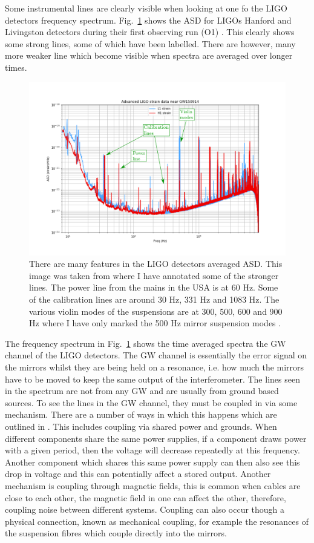 Some instrumental lines are clearly visible when looking at one fo the \ac{LIGO} detectors frequency spectrum. Fig.~\ref{detchar:line:psd} shows the \ac{ASD} for \acp{LIGO} Hanford and Livingston detectors during their first observing run (O1) \citep{GWOpen}. This clearly shows some strong lines, some of which have been labelled. There are however, many more weaker line which become visible when spectra are averaged over longer times.
\begin{figure}
    \centering
    \includegraphics[width=\textwidth]{C5_detchar/ligo_o1_asd_annot.pdf}
    \caption{There are many features in the \ac{LIGO} detectors averaged \ac{ASD}. This image was taken from \citep{GWOpen} where I have annotated some of the stronger lines. The power line from the mains in the USA is at 60 Hz. Some of the calibration lines are around 30 Hz, 331 Hz and 1083 Hz. The various violin modes of the suspensions are at 300, 500, 600 and 900 Hz where I have only marked the 500 Hz mirror suspension modes \citep{GWOpen}.}
    \label{detchar:line:psd}
\end{figure}
The frequency spectrum in Fig.~\ref{detchar:line:psd} shows the time averaged spectra the \ac{GW} channel of the \ac{LIGO} detectors. 
The \ac{GW} channel is essentially the error signal on the mirrors whilst they are being held on a resonance, i.e. how much the mirrors have to be moved to keep the same output of the interferometer.
The lines seen in the spectrum are not from any \ac{GW} and are usually from ground based sources.
To see the lines in the \ac{GW} channel, they must be coupled in via some mechanism. 
There are a number of ways in which this happens which are outlined in \citep{covas2018IdentificationMitigation}.
This includes coupling via shared power and grounds. 
When different components share the same power supplies, if a component draws power with a given period, then the voltage will decrease repeatedly at this frequency. 
Another component which shares this same power supply can then also see this drop in voltage and this can potentially affect a stored output. 
Another mechanism is coupling through magnetic fields, this is common when cables are close to each other, the magnetic field in one can affect the other, therefore, coupling noise between different systems.
Coupling can also occur though a physical connection, known as mechanical coupling, for example the resonances of the suspension fibres which couple directly into the mirrors.

